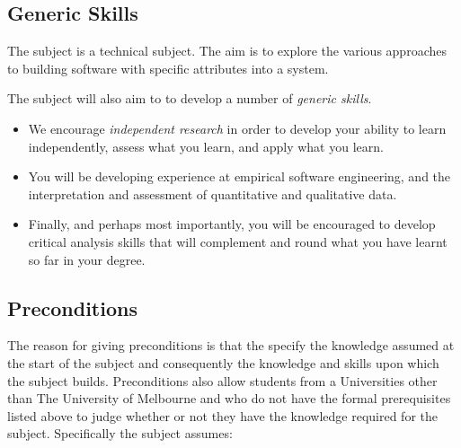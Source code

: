 \subsection*{Generic Skills}

The subject is a technical subject. The aim is to explore the various
approaches to building software with specific attributes into a
system.

The subject will also aim to to develop a number of {\em generic
skills}.

\begin{itemize}

  \item We encourage {\em independent research} in order to develop
    your ability to learn independently, assess what you learn, and
    apply what you learn.
  
  \item You will be developing experience at empirical software
    engineering, and the interpretation and assessment of quantitative
    and qualitative data.
  
  \item Finally, and perhaps most importantly, you will be encouraged
    to develop critical analysis skills that will complement and round
    what you have learnt so far in your degree.

\end{itemize}

\subsection*{Preconditions}

The reason for giving preconditions is that the specify the knowledge assumed at the start of the subject and consequently the knowledge and skills upon which the subject builds. Preconditions also allow students from a Universities other than The University of Melbourne and who do not have the formal prerequisites listed above to judge whether or not they have the knowledge required for the subject. 
Specifically the subject assumes:


